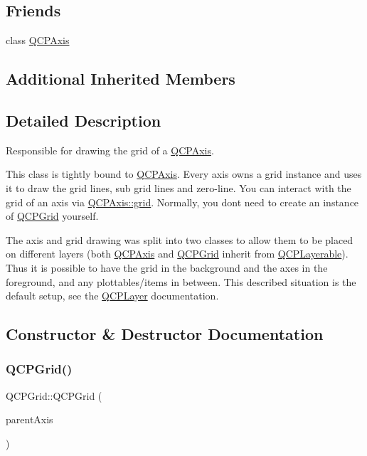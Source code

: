 \subsection*{Friends}
\begin{DoxyCompactItemize}
\item 
class \mbox{\hyperlink{class_q_c_p_grid_af123edeca169ec7a31958a1d714e1a8a}{Q\+C\+P\+Axis}}
\end{DoxyCompactItemize}
\subsection*{Additional Inherited Members}


\subsection{Detailed Description}
Responsible for drawing the grid of a \mbox{\hyperlink{class_q_c_p_axis}{Q\+C\+P\+Axis}}. 

This class is tightly bound to \mbox{\hyperlink{class_q_c_p_axis}{Q\+C\+P\+Axis}}. Every axis owns a grid instance and uses it to draw the grid lines, sub grid lines and zero-\/line. You can interact with the grid of an axis via \mbox{\hyperlink{class_q_c_p_axis_a63f1dd2df663680d2a8d06c19592dd63}{Q\+C\+P\+Axis\+::grid}}. Normally, you don\textquotesingle{}t need to create an instance of \mbox{\hyperlink{class_q_c_p_grid}{Q\+C\+P\+Grid}} yourself.

The axis and grid drawing was split into two classes to allow them to be placed on different layers (both \mbox{\hyperlink{class_q_c_p_axis}{Q\+C\+P\+Axis}} and \mbox{\hyperlink{class_q_c_p_grid}{Q\+C\+P\+Grid}} inherit from \mbox{\hyperlink{class_q_c_p_layerable}{Q\+C\+P\+Layerable}}). Thus it is possible to have the grid in the background and the axes in the foreground, and any plottables/items in between. This described situation is the default setup, see the \mbox{\hyperlink{class_q_c_p_layer}{Q\+C\+P\+Layer}} documentation. 

\subsection{Constructor \& Destructor Documentation}
\mbox{\label{class_q_c_p_grid_acd1cdd2909625388a13048b698494a17}} 
\subsubsection{\texorpdfstring{QCPGrid()}{QCPGrid()}}
{\footnotesize\ttfamily Q\+C\+P\+Grid\+::\+Q\+C\+P\+Grid (\begin{DoxyParamCaption}\item[{\mbox{\hyperlink{class_q_c_p_axis}{Q\+C\+P\+Axis}} $\ast$}]{parent\+Axis }\end{DoxyParamCaption})\hspace{0.3cm}{\ttfamily [explicit]}}

